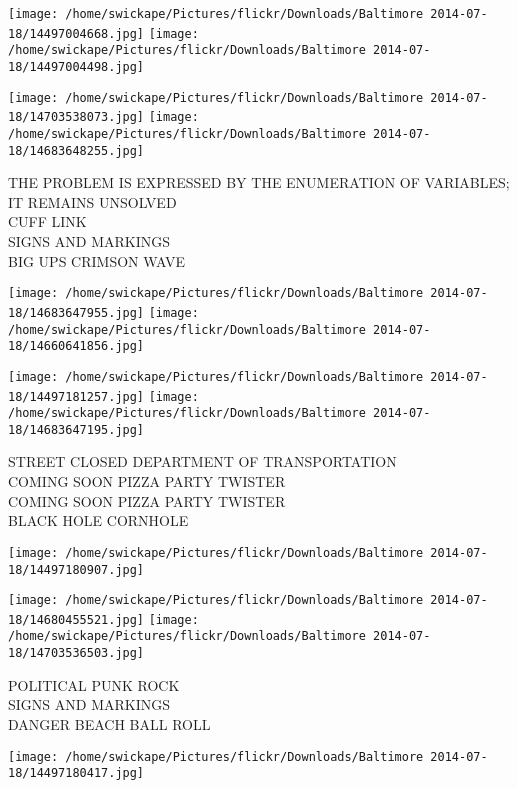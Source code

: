 \documentclass[10pt,letterpaper]{article}
\begin{document}
\texttt{[image: /home/swickape/Pictures/flickr/Downloads/Baltimore 2014-07-18/14497004668.jpg]}
\texttt{[image: /home/swickape/Pictures/flickr/Downloads/Baltimore 2014-07-18/14497004498.jpg]}

\texttt{[image: /home/swickape/Pictures/flickr/Downloads/Baltimore 2014-07-18/14703538073.jpg]}
\texttt{[image: /home/swickape/Pictures/flickr/Downloads/Baltimore 2014-07-18/14683648255.jpg]}

THE PROBLEM IS EXPRESSED BY THE ENUMERATION OF VARIABLES; IT REMAINS UNSOLVED\\
CUFF LINK\\
SIGNS AND MARKINGS\\
BIG UPS CRIMSON WAVE\\
\pagebreak

\texttt{[image: /home/swickape/Pictures/flickr/Downloads/Baltimore 2014-07-18/14683647955.jpg]}
\texttt{[image: /home/swickape/Pictures/flickr/Downloads/Baltimore 2014-07-18/14660641856.jpg]}

\texttt{[image: /home/swickape/Pictures/flickr/Downloads/Baltimore 2014-07-18/14497181257.jpg]}
\texttt{[image: /home/swickape/Pictures/flickr/Downloads/Baltimore 2014-07-18/14683647195.jpg]}

STREET CLOSED DEPARTMENT OF TRANSPORTATION\\
COMING SOON PIZZA PARTY TWISTER\\
COMING SOON PIZZA PARTY TWISTER\\
BLACK HOLE CORNHOLE\\
\pagebreak

\texttt{[image: /home/swickape/Pictures/flickr/Downloads/Baltimore 2014-07-18/14497180907.jpg]}

\vspace{0.25in}
\texttt{[image: /home/swickape/Pictures/flickr/Downloads/Baltimore 2014-07-18/14680455521.jpg]}
\texttt{[image: /home/swickape/Pictures/flickr/Downloads/Baltimore 2014-07-18/14703536503.jpg]}

POLITICAL PUNK ROCK\\
SIGNS AND MARKINGS\\
DANGER BEACH BALL ROLL\\
\pagebreak

\texttt{[image: /home/swickape/Pictures/flickr/Downloads/Baltimore 2014-07-18/14497180417.jpg]}
\end{document}
